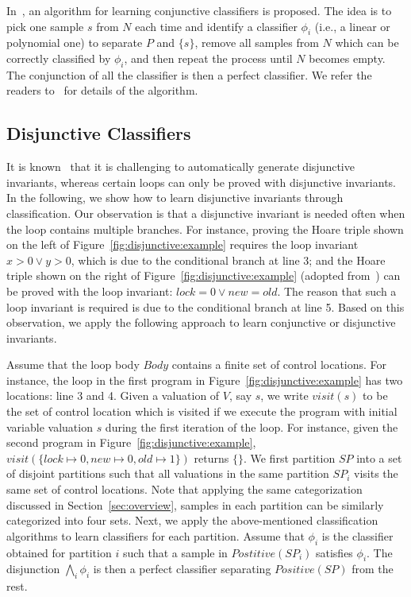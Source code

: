 In~\cite{sharma2012interpolants}, an algorithm for learning conjunctive classifiers is proposed. The idea is to pick one sample $s$ from $N$ each time and identify a classifier $\phi_i$ (i.e., a linear or polynomial one) to
separate $P$ and $\{s\}$, remove all samples from $N$ which can be correctly classified by $\phi_i$, and then repeat the process until $N$ becomes empty. The conjunction of all the classifier is then a perfect classifier. We refer the readers to~\cite{sharma2012interpolants} for details of the algorithm. %

\subsection{Disjunctive Classifiers}
It is known~\cite{DBLP:conf/cav/SharmaDDA11,DBLP:conf/pldi/GulwaniSV08} that it is challenging to automatically generate disjunctive invariants, whereas certain loops can only be proved with disjunctive invariants. In the following, we show how to learn disjunctive invariants through classification. Our observation is that a disjunctive invariant is needed often when the loop contains multiple branches. For instance, proving the Hoare triple shown on the left of Figure~\ref{fig:disjunctive:example} requires the loop invariant $x > 0 \lor y > 0$, which is due to the conditional branch at line 3; and the Hoare triple shown on the right of Figure~\ref{fig:disjunctive:example} (adopted from~\cite{DBLP:conf/popl/HenzingerJMS02}) can be proved with the loop invariant: $lock = 0 \lor new = old$. The reason that such a loop invariant is required is due to the conditional branch at line 5. Based on this observation, we apply the following approach to learn conjunctive or disjunctive invariants. 

Assume that the loop body $Body$ contains a finite set of control locations. For instance, the loop in the first program in Figure~\ref{fig:disjunctive:example} has two locations: line 3 and 4. Given a valuation of $V$, say $s$, we write $visit(s)$ to be the set of control location which is visited if we execute the program with initial variable valuation $s$ during the first iteration of the loop. For instance, given the second program in Figure~\ref{fig:disjunctive:example}, $visit(\{lock \mapsto 0, new \mapsto 0, old \mapsto 1\})$ returns $\{\}$. We first partition $SP$ into a set of disjoint partitions such that all valuations in the same partition $SP_i$ visits the same set of control locations. Note that applying the same categorization discussed in Section~\ref{sec:overview}, samples in each partition can be similarly categorized into four sets. Next, we apply the above-mentioned classification algorithms to learn classifiers for each partition. Assume that $\phi_i$ is the classifier obtained for partition $i$ such that a sample in $Postitive(SP_i)$ satisfies $\phi_i$. The disjunction $\bigwedge_i \phi_i$ is then a perfect classifier separating $Positive(SP)$ from the rest.

